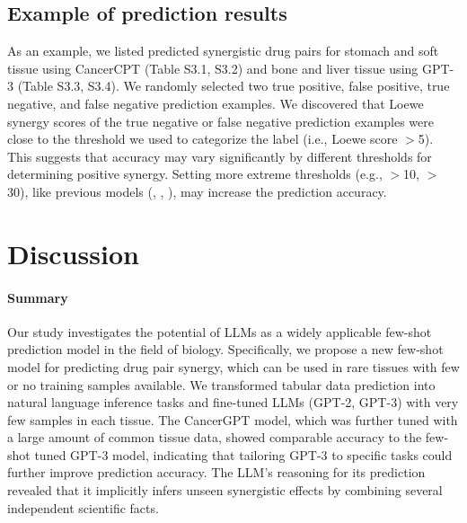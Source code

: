 \subsection{Example of prediction results}
As an example, we listed predicted synergistic drug pairs for stomach and soft tissue using CancerCPT (Table S3.1, S3.2) and bone and liver tissue using GPT-3 (Table S3.3, S3.4). We randomly selected two true positive, false positive, true negative, and false negative prediction examples.
We discovered that Loewe synergy scores of the true negative or false negative prediction examples were close to the threshold we used to categorize the label (i.e., Loewe score $>$5). This suggests that accuracy may vary significantly by different thresholds for determining positive synergy. Setting more extreme thresholds (e.g., $>$10, $>$30), like previous models (\cite{kim_anticancer_2021}, \cite{kuru_matchmaker_2022}, \cite{hosseini_ccsynergy_2023}), may increase the prediction accuracy. 

\section{Discussion} 

\paragraph{Summary}
Our study investigates the potential of LLMs as a widely applicable few-shot prediction model in the field of biology. Specifically, we propose a new few-shot model for predicting drug pair synergy, which can be used in rare tissues with few or no training samples available. We transformed tabular data prediction into natural language inference tasks and fine-tuned LLMs (GPT-2, GPT-3) with very few samples in each tissue. The CancerGPT model, which was further tuned with a large amount of common tissue data, showed comparable accuracy to the few-shot tuned GPT-3 model, indicating that tailoring GPT-3 to specific tasks could further improve prediction accuracy. The LLM's reasoning for its prediction revealed that it implicitly infers unseen synergistic effects by combining several independent scientific facts. 

